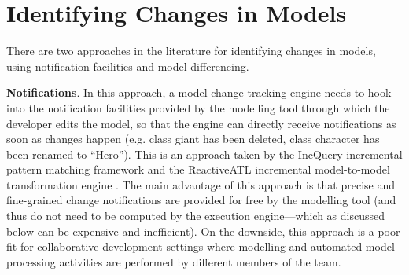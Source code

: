 %
%
%

\section{Identifying Changes in Models}
\label{sec:identifying_changes_in models}
There are two approaches in the literature for identifying changes in models, using notification facilities and model differencing.

\textbf{Notifications}. In this approach, a model change tracking 
engine needs to hook into the notification facilities 
provided by the modelling tool through which the developer edits the model, 
so that the engine can directly receive notifications as soon as 
changes happen (e.g. class \textsf{giant} has been deleted, class \textsf{character} has been renamed to ``Hero''). 
This is an approach taken by the IncQuery incremental pattern matching 
framework \cite{DBLP:conf/ecmdafa/RathHV12} and the ReactiveATL incremental model-to-model 
transformation engine \cite{DBLP:conf/ecmdafa/OgunyomiRK15}. The main advantage of this 
approach is that precise and fine-grained change notifications are provided 
for free by the modelling tool (and thus do not need to be computed by the 
execution engine---which as discussed below can be expensive and inefficient). 
On the downside, this approach is a poor fit for collaborative development 
settings where modelling and automated model processing activities are 
performed by different members of the team.

